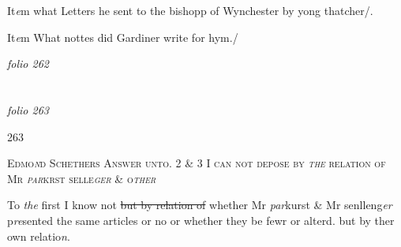 \documentclass[12pt, a4paper]{book}
\begin{document}
				\marginpar[\vspace{0.5cm}{\textcolor{Gray}{33}}]{}
			
		\ifthenelse{\isodd{\thepage}}
		{\reversemarginpar}
		{\normalmarginpar}
		It\textit{e}m what Letters he sent to the bishopp of Wynchester by 
yong thatcher/.

				\marginpar[\vspace{0.5cm}{\textcolor{Gray}{34}}]{}
			
		\ifthenelse{\isodd{\thepage}}
		{\reversemarginpar}
		{\normalmarginpar}
		It\textit{e}m What nottes did Gardiner write for hym./

\dotfill
						\newpage
{}

\textit{folio 262}


         \vspace*{4cm}
         
\dotfill
						  \section*{}  \subsection*{}

\textit{folio 263}



            		\begin{flushright}{\color{Mahogany}263}\end{flushright}


				\begin{center} \begin{large} {\scshape Edmo\textit{n}d Schethers Answer unto. 
2 \& 3 I can not depose by \textit{the} relation of Mr \textit{par}krst selle\textit{ger} \& o\textit{ther}} \end{large} \end{center}
			

				\marginpar[\vspace{0.5cm}{\textcolor{Gray}{1}}]{}
			

		\ifthenelse{\isodd{\thepage}}
		{\reversemarginpar}
		{\normalmarginpar}
		To \textit{the} first I know not \sout{but by relation of}
               whether 
			Mr \textit{par}kurst \& Mr senlleng\textit{er }p\textit{re}sented the 
same articles or no or whether they be fewr or alterd. but by ther own relatio\textit{n}.
\end{document}
